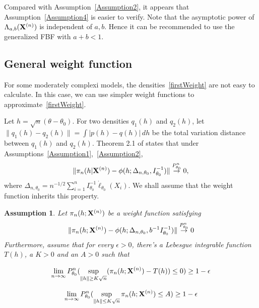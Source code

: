 \documentclass[11pt]{article}
\theoremstyle{plain}
\newtheorem{assumption}{\quad\quad Assumption}
\theoremstyle{definition}
\theoremstyle{remark}
\begin{document}
Compared with Assumption~\ref{Assumption2}, it appears that Assumption~\ref{Assumption4} is easier to verify.
Note that the asymptotic power of $\Lambda_{a,b}(\mathbf{X}^{(n)})$ is independent of $a,b$.
Hence it can be recommended to use the generalized FBF with $a+b< 1$.


\subsection{General weight function}

For some moderately complexi models, the densities~\eqref{firstWeight} are not easy to calculate.
In this case, we can use simpler weight functions to approximate~\eqref{firstWeight}.

Let $h=\sqrt{n}(\theta-\theta_0)$.
For two densities $q_1(h)$ and $q_2(h)$, let $\|q_1(h)-q_2(h)\|=\int |p(h)-q(h)|\, dh$ be the total variation distance between $q_1(h)$ and $q_2(h)$.
Theorem 2.1 of \cite{Kleijn2012The} states that
under Assumptions~\ref{Assumption1},~\ref{Assumption2},
$$
            \|\pi_n(h|\mathbf{X}^{(n)})-\phi(h;\Delta_{n,\theta_0},I_{\theta_0}^{-1})\|\overset{P_{\theta_0}^n}{\to}0,
$$
where
$\Delta_{n,\theta_0}=n^{-1/2}\sum_{i=1}^n I_{\theta_0}^{-1}\dot{\ell}_{\theta_0}(X_i)$.
We shall assume that the weight function inherits this property.
        
\begin{assumption}\label{Assumption3}
    Let $\pi_n(h;\mathbf{X}^{(n)})$ be a weight function satisfying 
        \begin{equation}\label{vonMisesResults}
            \|\pi_n(h;\mathbf{X}^{(n)})-\phi(h;\Delta_{n,\theta_0},b^{-1}I_{\theta_0}^{-1})\|\overset{P_{\theta_0}^n}{\to}0
        \end{equation}
Furthermore, assume that for every $\epsilon>0$, there's a Lebesgue integrable function $T(h)$, a $K>0$ and an $A>0$ such that 

    \begin{equation}\label{Assump31}
        \lim_{n\to \infty}P_{\theta_0}^n(\sup_{\|h\|\geq K\sqrt{n}}(\pi_n(h;\mathbf{X}^{(n)})-T(h))\leq 0)\geq 1-\epsilon
\end{equation}

        \begin{equation}\label{Assump32}
            \lim_{n\to \infty} P_{\theta_0}^n(\sup_{\|h\|\leq K\sqrt{n}} \pi_n(h;\mathbf{X}^{(n)})\leq A)\geq 1-\epsilon
        \end{equation}
\end{assumption}
\end{document}
